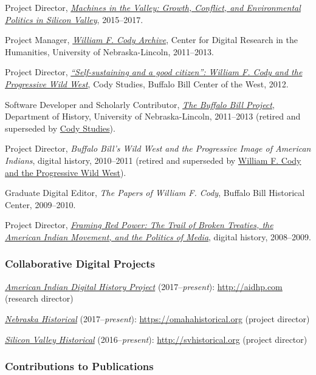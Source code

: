 Project Director,
\emph{\href{http://dissertation.jasonheppler.org}{Machines in the
Valley: Growth, Conflict, and Environmental Politics in Silicon
Valley}}, 2015--2017.

Project Manager, \emph{\href{http://codyarchive.org/}{William F. Cody
Archive}}, Center for Digital Research in the Humanities, University of
Nebraska-Lincoln, 2011--2013.

Project Director,
\emph{\href{http://www.codystudies.org/showindians/}{``Self-sustaining
and a good citizen'': William F. Cody and the Progressive Wild West}},
Cody Studies, Buffalo Bill Center of the West, 2012.

Software Developer and Scholarly Contributor,
\emph{\href{http://buffalobillproject.unl.edu/}{The Buffalo Bill
Project}}, Department of History, University of Nebraska-Lincoln,
2011--2013 (retired and superseded by
\href{http://www.codystudies.org/}{Cody Studies}).

Project Director, \emph{Buffalo Bill's Wild West and the Progressive
Image of American Indians}, digital history, 2010--2011 (retired and
superseded by \href{http://www.codystudies.org/showindians/}{William F.
Cody and the Progressive Wild West}).

Graduate Digital Editor, \emph{The Papers of William F. Cody}, Buffalo
Bill Historical Center, 2009--2010.

Project Director, \emph{\href{http://framingredpower.org}{Framing Red
Power: The Trail of Broken Treaties, the American Indian Movement, and
the Politics of Media}}, digital history, 2008--2009.

\subsubsection{Collaborative Digital
Projects}\label{collaborative-digital-projects}

\emph{\href{http://aidhp.com}{American Indian Digital History Project}}
(2017--\emph{present}): \url{http://aidhp.com} (research director)

\emph{\href{https://omahahistorical.org}{Nebraska Historical}}
(2017--\emph{present}): \url{https://omahahistorical.org} (project
director)

\emph{\href{http://svhistorical.org}{Silicon Valley Historical}}
(2016--\emph{present}): \url{http://svhistorical.org} (project director)

\subsubsection{Contributions to
Publications}\label{contributions-to-publications}

